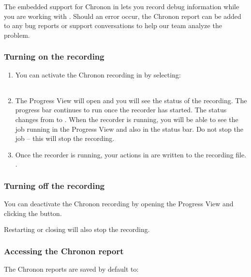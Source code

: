 
The embedded support for Chronon in \app{} lets you record debug information while you are working with \app{}. Should an error occur, the Chronon report can be added to any bug reports or support conversations to help our team analyze the problem. 

\subsubsection{Turning on the recording}
\begin{enumerate}
\item You can activate the Chronon recording in \app{} by selecting:\\
\\
\item The Progress View will open and you will see the status of the recording. The progress bar continues to run once the recorder has started. The status changes from  to . When the recorder is running, you will be able to see the job running in the Progress View and also in the status bar. Do not stop the job -- this will stop the recording. 
\item Once the recorder is running, your actions in \app{} are written to the recording file.
. 
\end{enumerate}

 
\subsubsection{Turning off the recording}
You can deactivate the Chronon recording by opening the Progress View and clicking the  button. 

Restarting or closing \app{} will also stop the recording. 

\subsubsection{Accessing the Chronon report}
The Chronon reports are saved by default to:\\
\\

